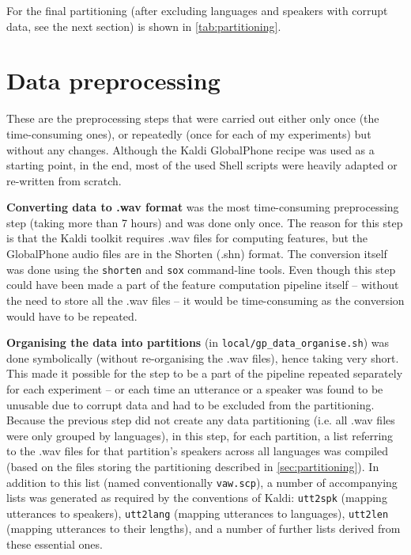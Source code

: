 \documentclass[bsc,frontabs,twoside,singlespacing,parskip,deptreport]{infthesis}
\begin{document}
{{    For the final partitioning (after excluding languages and speakers with corrupt data, see the next section) is shown in \autoref{tab:partitioning}.  
  }

  \section{Data preprocessing}{
    \label{sec:preprocessing}
    These are the preprocessing steps that were carried out either only once (the time-consuming ones), or repeatedly (once for each of my experiments) but without any changes. Although the Kaldi GlobalPhone recipe was used as a starting point, in the end, most of the used Shell scripts were heavily adapted or re-written from scratch.

    \textbf{Converting data to .wav format} was the most time-consuming preprocessing step (taking more than 7 hours) and was done only once. The reason for this step is that the Kaldi toolkit requires .wav files for computing features, but the GlobalPhone audio files are in the Shorten (.shn) format. The conversion itself was done using the \texttt{shorten} and \texttt{sox} command-line tools. Even though this step could have been made a part of the feature computation pipeline itself -- without the need to store all the .wav files -- it would be time-consuming as the conversion would have to be repeated.

    \textbf{Organising the data into partitions} (in \verb|local/gp_data_organise.sh|) was done symbolically (without re-organising the .wav files), hence taking very short. This made it possible for the step to be a part of the pipeline repeated separately for each experiment -- or each time an utterance or a speaker was found to be unusable due to corrupt data and had to be excluded from the partitioning. Because the previous step did not create any data partitioning (i.e. all .wav files were only grouped by languages), in this step, for each partition, a list referring to the .wav files for that partition's speakers across all languages was compiled (based on the files storing the partitioning described in \autoref{sec:partitioning}). In addition to this list (named conventionally \texttt{vaw.scp}), a number of accompanying lists was generated as required by the conventions of Kaldi: \texttt{utt2spk} (mapping utterances to speakers), \texttt{utt2lang} (mapping utterances to languages), \texttt{utt2len} (mapping utterances to their lengths), and a number of further lists derived from these essential ones.

}}
\end{document}
